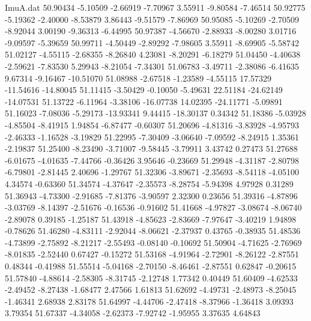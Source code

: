 \begin{filecontents}{ImuA.dat}
  50.90434   -5.10509   -2.66919   -7.70967    3.55911   -9.80584   -7.46514
  50.92775   -5.19362   -2.40000   -8.53879    3.86443   -9.51579   -7.86969
  50.95085   -5.10269   -2.70509   -8.92044    3.00190   -9.36313   -6.44995
  50.97387   -4.56670   -2.88933   -8.00280    3.01716   -9.09597   -5.39659
  50.99711   -4.50449   -2.89292   -7.98605    3.55911   -8.69905   -5.58742
  51.02127   -4.55115   -2.68355   -8.26840    4.23081   -8.20291   -6.18279
  51.04450   -4.40638   -2.59621   -7.83530    5.29943   -8.21054   -7.34301
  51.06783   -3.49711   -2.38086   -6.41635    9.67314   -9.16467  -10.51070
  51.08988   -2.67518   -1.23589   -4.55115   17.57329  -11.54616  -14.80045
  51.11415   -3.50429   -0.10050   -5.49631   22.51184  -24.62149  -14.07531
  51.13722   -6.11964   -3.38106  -16.07738   14.02395  -24.11771   -5.09891
  51.16023   -7.08036   -5.29173  -13.93341    9.44415  -18.30137    0.34342
  51.18386   -5.03928   -4.85504   -8.41915    1.94854   -6.87477   -0.60307
  51.20696   -4.81316   -3.83928   -4.95793   -2.46333   -1.16528   -3.19829
  51.22995   -7.30409   -3.06640   -7.09592   -8.24915    1.35361   -2.19837
  51.25400   -8.23490   -3.71007   -9.58445   -3.79911    3.43742    0.27473
  51.27688   -6.01675   -4.01635   -7.44766   -0.36426    3.95646   -0.23669
  51.29948   -4.31187   -2.80798   -6.79801   -2.81445    2.40696   -1.29767
  51.32306   -3.89671   -2.35693   -8.54118   -4.05100    4.34574   -0.63360
  51.34574   -4.37647   -2.35573   -8.28754   -5.94398    4.97928    0.31289
  51.36943   -4.73300   -2.91685   -7.81376   -3.90597    2.32300    0.23656
  51.39316   -4.87896   -3.03769   -8.14397   -2.51676   -0.16536   -0.91602
  51.41668   -4.97827   -3.08674   -8.06740   -2.89078    0.39185   -1.25187
  51.43918   -4.85623   -2.83669   -7.97647   -3.40219    1.94898   -0.78626
  51.46280   -4.83111   -2.92044   -8.06621   -2.37937    0.43765   -0.38935
  51.48536   -4.73899   -2.75892   -8.21217   -2.55493   -0.08140   -0.10692
  51.50904   -4.71625   -2.76969   -8.01835   -2.52440    0.67427   -0.15272
  51.53168   -4.91964   -2.72901   -8.26122   -2.87551    0.48344   -0.41988
  51.55514   -5.04168   -2.70150   -8.46461   -2.87551    0.62847   -0.20615
  51.57840   -4.88614   -2.58305   -8.31745   -2.12748    1.77342    0.40449
  51.60409   -4.62533   -2.49452   -8.27438   -1.68477    2.47566    1.61813
  51.62692   -4.49731   -2.48973   -8.25045   -1.46341    2.68938    2.83178
  51.64997   -4.44706   -2.47418   -8.37966   -1.36418    3.09393    3.79354
  51.67337   -4.34058   -2.62373   -7.92742   -1.95955    3.37635    4.64843

\end{filecontents}
